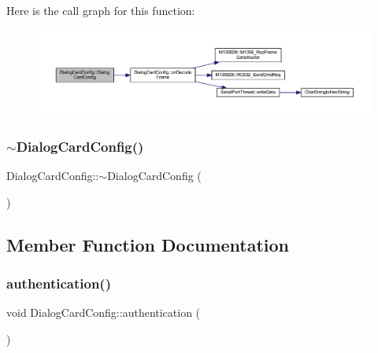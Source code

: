Here is the call graph for this function\+:
\nopagebreak
\begin{figure}[H]
\begin{center}
\leavevmode
\includegraphics[width=350pt]{class_dialog_card_config_ac2fd1ef6027d881432914a2a9768757f_cgraph}
\end{center}
\end{figure}
\mbox{\label{class_dialog_card_config_aca6a38d16e5c32d6e8c4bb54153b412c}} 
\subsubsection{\texorpdfstring{$\sim$DialogCardConfig()}{~DialogCardConfig()}}
{\footnotesize\ttfamily Dialog\+Card\+Config\+::$\sim$\+Dialog\+Card\+Config (\begin{DoxyParamCaption}{ }\end{DoxyParamCaption})}



\subsection{Member Function Documentation}
\mbox{\label{class_dialog_card_config_a4d73ad9ea40ad536bdccce7cb5a985bc}} 
\subsubsection{\texorpdfstring{authentication()}{authentication()}}
{\footnotesize\ttfamily void Dialog\+Card\+Config\+::authentication (\begin{DoxyParamCaption}{ }\end{DoxyParamCaption})}



